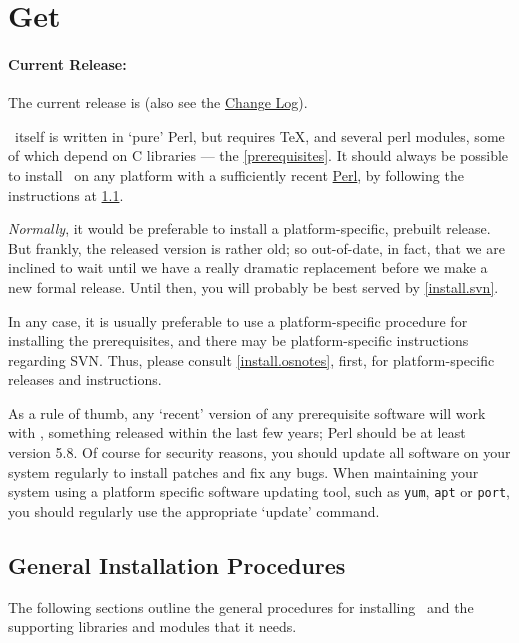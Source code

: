 \documentclass{article}
\begin{document}
\section{Get \LaTeXML}\label{get}
\paragraph{Current Release:}\label{download.current}
The current release is \textbf{\CurrentVersion}
(also see the \href{Changes}{Change Log}).

\LaTeXML\ itself is written in `pure' Perl, but requires \TeX,
and several perl modules, some of which depend on C libraries --- the \ref{prerequisites}.
It should always be possible to install \LaTeXML\ on any platform
with a sufficiently recent \href{http://www.perl.org/}{Perl},
by following the instructions at \ref{install.general}.


\emph{Normally}, it would be preferable to install a platform-specific, prebuilt release.
But frankly, the released version is rather old;
so out-of-date, in fact, that we are inclined to wait until we
have a really dramatic replacement before we make a new formal release.
Until then, you will probably be best served by \ref{install.svn}.

In any case, it is usually preferable to use a platform-specific procedure
for installing the prerequisites, and there may be platform-specific
instructions regarding SVN.
Thus, please consult \ref{install.osnotes}, first,
for platform-specific releases and instructions.

As a rule of thumb, any `recent' version of any prerequisite software will
work with \LaTeXML, something released within the last few years;
Perl should be at least version 5.8.
Of course for security reasons, you should update all software on your system
regularly to install patches and fix any bugs.
When maintaining your system using a platform specific software
updating tool, such as \texttt{yum}, \texttt{apt} or \texttt{port},
you should regularly use the appropriate `update' command.

\subsection{General Installation Procedures}\label{install.general}
The following sections outline the general procedures for installing
\LaTeXML\ and the supporting libraries and modules that it needs.
\end{document}

